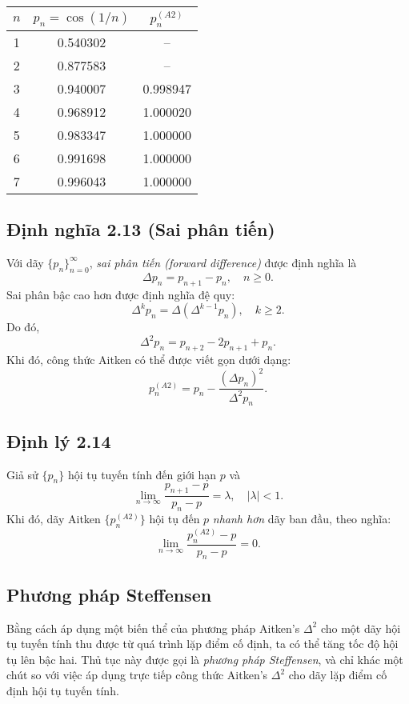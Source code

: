 \begin{center}
\label{tab:aitken-example}
\begin{tabular}{|c|c|c|}
\hline
$n$ & $p_n = \cos(1/n)$ & $p_n^{(A2)}$ \\
\hline
1 & 0.540302 & -- \\
2 & 0.877583 & -- \\
3 & 0.940007 & 0.998947 \\
4 & 0.968912 & 1.000020 \\
5 & 0.983347 & 1.000000 \\
6 & 0.991698 & 1.000000 \\
7 & 0.996043 & 1.000000 \\
\hline
\end{tabular}
\end{center}

\subsection*{\textbf{Định nghĩa 2.13 (Sai phân tiến)}}

Với dãy $\{p_n\}_{n=0}^\infty$, \textit{sai phân tiến (forward difference)} được định nghĩa là
\[
\Delta p_n = p_{n+1} - p_n, \quad n \ge 0.
\]
Sai phân bậc cao hơn được định nghĩa đệ quy:
\[
\Delta^k p_n = \Delta(\Delta^{k-1} p_n), \quad k \ge 2.
\]
Do đó,
\[
\Delta^2 p_n = p_{n+2} - 2p_{n+1} + p_n.
\]
Khi đó, công thức Aitken có thể được viết gọn dưới dạng:
\[
p_n^{(A2)} = p_n - \frac{(\Delta p_n)^2}{\Delta^2 p_n}.
\]


\subsection*{\textbf{Định lý 2.14}}

Giả sử $\{p_n\}$ hội tụ tuyến tính đến giới hạn $p$ và
\[
\lim_{n \to \infty} \frac{p_{n+1} - p}{p_n - p} = \lambda, \quad |\lambda| < 1.
\]
Khi đó, dãy Aitken $\{p_n^{(A2)}\}$ hội tụ đến $p$ \textit{nhanh hơn} dãy ban đầu, 
theo nghĩa:
\[
\lim_{n \to \infty} \frac{p_n^{(A2)} - p}{p_n - p} = 0.
\]

\subsection*{\textbf{Phương pháp Steffensen}}

Bằng cách áp dụng một biến thể của phương pháp Aitken’s $\Delta^2$ 
cho một dãy hội tụ tuyến tính thu được từ quá trình lặp điểm cố định, 
ta có thể tăng tốc độ hội tụ lên bậc hai. 
Thủ tục này được gọi là \textit{phương pháp Steffensen}, 
và chỉ khác một chút so với việc áp dụng trực tiếp công thức Aitken’s $\Delta^2$ 
cho dãy lặp điểm cố định hội tụ tuyến tính.

